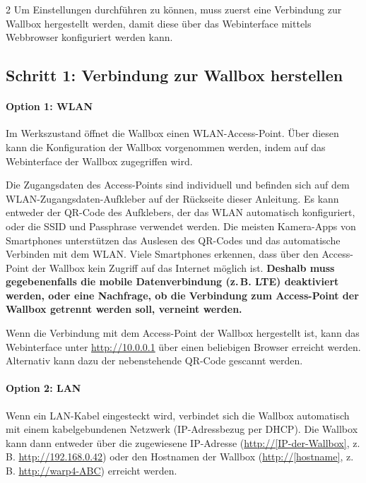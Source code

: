 \documentclass[a4paper,10pt]{article}
\begin{document}
\begin{multicols*}{2}
    Um Einstellungen durchführen zu können, muss zuerst eine Verbindung
    zur Wallbox hergestellt werden, damit diese über das Webinterface mittels
	Webbrowser konfiguriert werden kann.

    \subsection{Schritt 1: Verbindung zur Wallbox herstellen}

    \paragraph*{Option 1: WLAN}
    Im Werkszustand öffnet die Wallbox einen WLAN-Access-Point. Über diesen kann
    die Konfiguration der Wallbox vorgenommen werden, indem auf das
    Webinterface der Wallbox zugegriffen wird.

    Die Zugangsdaten des Access-Points sind individuell und befinden sich auf dem WLAN-Zugangsdaten-Aufkleber
    auf der Rückseite dieser Anleitung. Es kann entweder der QR-Code des Aufklebers,
    der das WLAN automatisch konfiguriert, oder die SSID und Passphrase verwendet werden.
    Die meisten Kamera-Apps von Smartphones unterstützen das Auslesen des
    QR-Codes und das automatische Verbinden mit dem WLAN. Viele Smartphones
    erkennen, dass über den Access-Point der Wallbox kein Zugriff auf das
    Internet möglich ist. \textbf{Deshalb muss gegebenenfalls die mobile
	Datenverbindung (z.\,B. LTE) deaktiviert werden, oder eine Nachfrage, ob die
	Verbindung zum Access-Point der Wallbox getrennt werden soll, verneint
	werden.}

    \begin{minipage}{0.35\textwidth}
        Wenn die Verbindung mit dem Access-Point der Wallbox hergestellt ist, kann das Webinterface
        unter \url{http://10.0.0.1} über einen beliebigen Browser erreicht werden.
        Alternativ kann dazu der nebenstehende QR-Code gescannt werden.
    \end{minipage}\hfill
    \begin{minipage}{0.12\textwidth}
        \begin{flushright}
        \end{flushright}
    \end{minipage}

    \paragraph*{Option 2: LAN}
    Wenn ein LAN-Kabel eingesteckt wird, verbindet sich die
    Wallbox automatisch mit einem
    kabelgebundenen Netzwerk (IP-Adressbezug
    per DHCP). Die Wallbox kann dann entweder über die zugewiesene IP-Adresse (\url{http://[IP-der-Wallbox]}, z.\,B. \url{http://192.168.0.42})
    oder den Hostnamen der Wallbox (\url{http://[hostname]}, z.\,B.
    \url{http://warp4-ABC}) erreicht werden.


\end{multicols*}
\end{document}
